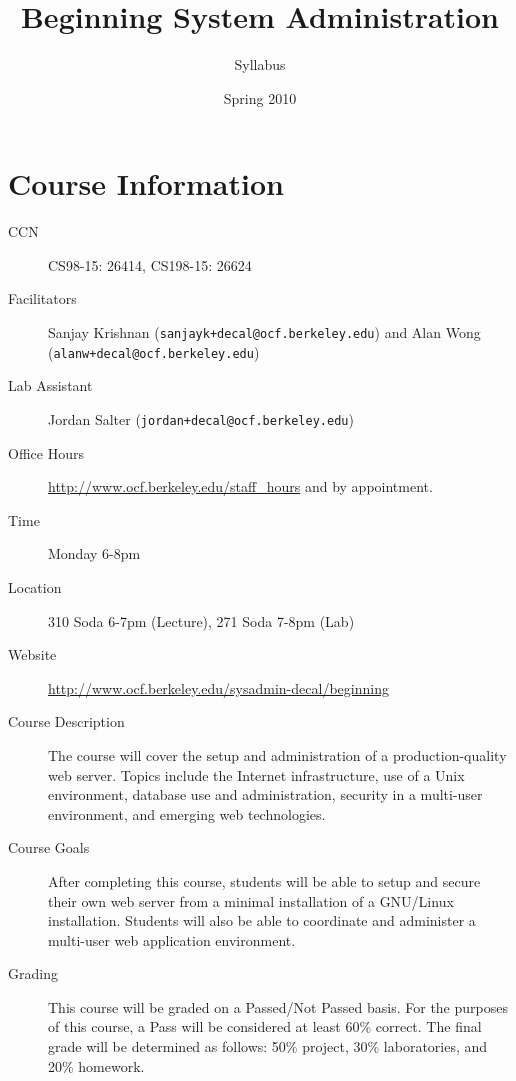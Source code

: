 \documentclass[letterpaper]{article}
\title{Beginning System Administration}
\author{Syllabus}
\date{Spring 2010}
\begin{document}
\maketitle

\section*{Course Information}

\begin{description}
  \item[CCN] CS98-15: 26414, CS198-15: 26624
  
  \item[Facilitators] Sanjay Krishnan (\texttt{sanjayk+decal@ocf.berkeley.edu}) and Alan Wong (\texttt{alanw+decal@ocf.berkeley.edu})
  
  \item[Lab Assistant] Jordan Salter (\texttt{jordan+decal@ocf.berkeley.edu})
  
  \item[Office Hours] \url{http://www.ocf.berkeley.edu/staff_hours} and by appointment.
  
 
 \item[Time] Monday 6-8pm
 
 \item[Location] 310 Soda 6-7pm (Lecture), 271 Soda 7-8pm (Lab)
  
  \item[Website] \url{http://www.ocf.berkeley.edu/sysadmin-decal/beginning}
  
  \item[Course Description] 
  The course will cover the setup and administration of a
	production-quality web server. Topics include the Internet
	infrastructure, use of a Unix environment, database use and
	administration, security in a multi-user environment, and emerging
	web technologies.
	
  \item[Course Goals]
		After completing this course, students will be able to setup and
		secure their own web server from a minimal installation of a
		GNU/Linux installation. Students will also be able to coordinate and
		administer a multi-user web application environment.

  \item[Grading]
		This course will be graded on a Passed/Not Passed basis. For the
		purposes of this course, a Pass will be considered at least 60\%
		correct. The final grade will be determined as follows: 50\%
		project, 30\% laboratories, and 20\% homework. 


\end{description}
\end{document}
